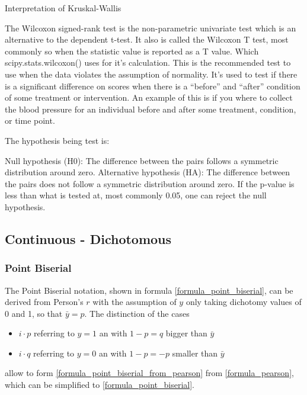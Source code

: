 \documentclass[a4paper,12pt]{report}
\begin{document}
Interpretation of Kruskal-Wallis


The Wilcoxon signed-rank test is the non-parametric univariate test which is an alternative to the dependent t-test. It also is called the Wilcoxon T test, most commonly so when the statistic value is reported as a T value. Which scipy.stats.wilcoxon() uses for it’s calculation. This is the recommended test to use when the data violates the assumption of normality. It’s used to test if there is a significant difference on scores when there is a “before” and “after” condition of some treatment or intervention. An example of this is if you where to collect the blood pressure for an individual before and after some treatment, condition, or time point.

The hypothesis being test is:

Null hypothesis (H0): The difference between the pairs follows a symmetric distribution around zero.
Alternative hypothesis (HA): The difference between the pairs does not follow a symmetric distribution around zero.
If the p-value is less than what is tested at, most commonly 0.05, one can reject the null hypothesis.

\subsection{Continuous - Dichotomous}

\subsubsection{Point Biserial}

The Point Biserial notation, shown in formula \ref{formula_point_biserial}, can be derived from Person's $r$ with the assumption of $y$ only taking dichotomy values of 0 and 1, so that $\bar{y} = p$. The distinction of the cases

\begin{itemize}
	\item $i \cdot p$ referring to $y=1$ an with $1 - p = q$ bigger than $\bar{y}$
	\item $i \cdot q$ referring to $y=0$ an with $1 - p = -p$ smaller than $\bar{y}$
\end{itemize}
allow to form \ref{formula_point_biserial_from_pearson} from \ref{formula_pearson}, which can be simplified to \ref{formula_point_biserial}. \cite{Tate1954,CohenWest2003,Bortz2004,DeJesus2019}

\smallskip
\end{document}
